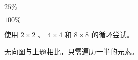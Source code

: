 {    %
    \begin{practicec}
        $25\%$
    \end{practicec}

    \begin{practicec}
        $100\%$
    \end{practicec}

    \begin{practicec}

    \end{practicec}

    \begin{practicec}
        使用 $2 \times 2$ 、 $4 \times 4$ 和 $8 \times 8$ 的循环尝试。
    \end{practicec}

    \begin{practicec}
        无向图与上题相比，只需遍历一半的元素。
    \end{practicec}
}
